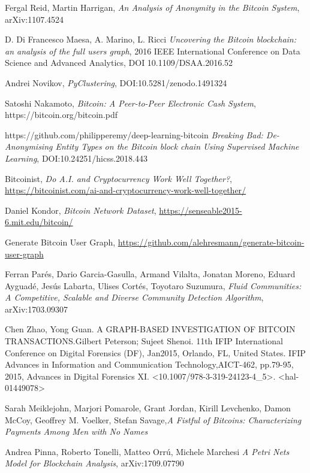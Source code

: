 \documentclass{article}
\begin{document}
\begin{thebibliography}{9}
Fergal Reid, Martin Harrigan,
\textit{An Analysis of Anonymity in the Bitcoin System},
arXiv:1107.4524

D. Di Francesco Maesa, A. Marino, L. Ricci
\textit{Uncovering the Bitcoin blockchain: an analysis of the full users graph},
2016 IEEE International Conference on Data Science and Advanced Analytics,
DOI 10.1109/DSAA.2016.52

Andrei Novikov, \textit{PyClustering},
DOI:10.5281/zenodo.1491324

Satoshi Nakamoto,
\textit{Bitcoin: A Peer-to-Peer Electronic Cash System},
https://bitcoin.org/bitcoin.pdf

https://github.com/philipperemy/deep-learning-bitcoin
\textit{Breaking Bad: De-Anonymising Entity Types on the Bitcoin block chain Using Supervised Machine Learning},
DOI:10.24251/hicss.2018.443

Bitcoinist,
\textit{Do A.I. and Cryptocurrency Work Well Together?},
\url{https://bitcoinist.com/ai-and-cryptocurrency-work-well-together/}

Daniel Kondor, \textit{Bitcoin Network Dataset},
\url{https://senseable2015-6.mit.edu/bitcoin/}

Generate Bitcoin User Graph,
\url{https://github.com/alehresmann/generate-bitcoin-user-graph}

Ferran Parés, Dario Garcia-Gasulla, Armand Vilalta, Jonatan Moreno, Eduard Ayguadé, Jesús Labarta, Ulises Cortés, Toyotaro Suzumura,
\textit{Fluid Communities: A Competitive, Scalable and Diverse Community Detection Algorithm},
 arXiv:1703.09307

Chen Zhao, Yong Guan. A GRAPH-BASED INVESTIGATION OF BITCOIN TRANSACTIONS.Gilbert Peterson; Sujeet Shenoi. 11th IFIP International Conference on Digital Forensics (DF), Jan2015, Orlando, FL, United States. IFIP Advances in Information and Communication Technology,AICT-462, pp.79-95, 2015, Advances in Digital Forensics XI. <10.1007/978-3-319-24123-4\_5>. <hal-01449078>

Sarah Meiklejohn, Marjori Pomarole, Grant Jordan, Kirill Levchenko, Damon McCoy, Geoffrey M. Voelker,  Stefan Savage,\textit{A Fistful of Bitcoins: Characterizing Payments Among Men with No Names}

Andrea Pinna, Roberto Tonelli, Matteo Orrú, Michele Marchesi \textit{A Petri Nets Model for Blockchain Analysis},
 arXiv:1709.07790


\end{thebibliography}
\end{document}
